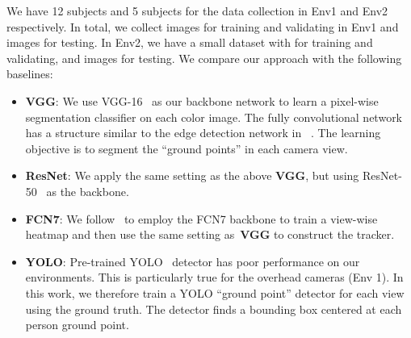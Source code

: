 \documentclass{article}
\begin{document}
We have 12 subjects and 5 subjects for the data collection in Env1 and Env2 respectively. 
In total, we collect  images for training and validating in Env1 and  images for testing. 
In Env2, we have a small dataset with  for training and validating, and  images for testing. 
We compare our approach with the following baselines:
\begin{itemize}
\item {\textbf{VGG}: We use VGG-16~\cite{simonyan2014very} as our backbone network to learn a pixel-wise segmentation classifier on each color image. 
The fully convolutional network has a structure similar to the edge detection network in ~\cite{HED}.
The learning objective is to segment the ``ground points'' in each camera view.}
	\item{\textbf{ResNet}: We apply the same setting as the above \textbf{VGG}, but using ResNet-50~\cite{he2016deep} as the backbone.}
	\item{\textbf{FCN7}}: We follow~\cite{count19} to employ the FCN7 backbone to train a view-wise heatmap and then use the same setting as~\textbf{VGG} to construct the tracker.
	\item{\textbf{YOLO}: Pre-trained YOLO~\cite{yolo} detector has poor performance on our environments. This is particularly true for the overhead cameras (Env 1).  In this work,
		we therefore train a YOLO ``ground point'' detector for each view using the ground truth.
                The detector finds a bounding box centered at each person ground point.  
}
\end{itemize}
\end{document}
